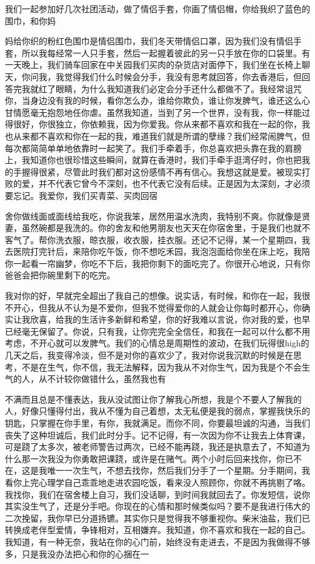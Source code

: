 \documentclass{article}
\begin{document}
我们一起参加好几次社团活动，做了情侣手套，你画了情侣帽，你给我织了蓝色的围巾，和你妈

\newpage 

妈给你织的粉红色围巾是情侣围巾，我们冬天带情侣口罩，因为我们没有情侣手套，所以我每经常一人只手套，然后一起握着彼此的另一只手放在你的口袋里。有一天晚上，我们骑车回家在中关园我们买肉的杂货店对面停下，我们坐在长椅上聊天，你问我，我觉得我们什么时候会分手，我没有思考就回答，你去香港后，但回答完我就红了眼睛，为什么我知道我们必定会分手还什么都做不了。我经常诅咒你，当身边没有我的时候，看你怎么办，谁给你欺负，谁让你发脾气，谁还这么心甘情愿毫无抱怨地任你虐。虽然我知道，当到了另一个世界，没有我，你一样能过得很好，你很独立，你依赖我，因为你爱我。你从来都不喜欢和我在一起的你，我也从来都不喜欢和你在一起的我，难道我们就是所谓的孽缘？我们经常闹脾气，但每次都简简单单地依靠时一起笑了。我们手牵着手，你总喜欢把头靠在我的肩膀上，我知道你也很珍惜这些瞬间，就算在香港时，我们手牵手逛湾仔时，你也把我的手握得很紧，尽管此时我们都对这份感情不再有信心。我想这就是爱。被现实打败的爱，并不代表它曾今不深刻，也不代表它没有后续。正是因为太深刻，才必须要忘记。我爱你，我们买青菜、买肉回宿

\newpage 

舍你做线面或面线给我吃，你说我笨，居然用温水洗肉，我特别不爽。你就像是贤妻，虽然碗都是我洗的。你的舍友和他男朋友也天天在你宿舍里，于是我们也就不客气了。帮你洗衣服，晾衣服，收衣服，挂衣服。还记不记得，某一个星期四，我去医院打完针后，来陪你吃午饭，你不想吃禾园，我泡泡面给你坐在床上吃，我陪你一起看一帘幽梦，你吃不下后，我把你剩下的面吃完了。你很开心地说，只有你爸爸会把你碗里剩下的吃完。

我对你的好，早就完全超出了我自己的想像。说实话，有时候，和你在一起，我很不开心，但我从不认为是不爱你，但我不觉得爱你的人就会让你每时都开心，你确实让我欣喜，给我的生活许多新鲜和希望，你的好我难以言说，你对我的爱，也早已经毫无保留了。你说，只有我，让你完完全全信任，和我在一起可以什么都不用考虑，不开心就可以发脾气。我们的心情总是周期性的波动，在我们玩得很high的几天之后，我变得冷淡，但不是对你的喜欢少了，我对你说我沉默的时候是在思考，不是在生气，你不信，我无法解释，因为我从不对你生气，因为我是个不会生气的人，从不计较你做错什么，虽然我也有

\newpage 

不满而且总是不懂表达，我从没试图让你了解我心所想，我是个不要人了解我的人，好像只懂得付出，我从不懂为自己着想，太无私便是我的弱点，掌握我快乐的钥匙，只掌握在你手里，有你，我就满足。而你不同，你要最坦诚的沟通，当我们丧失了这种坦诚后，我们此时分手。记不记得，有一次因为你不让我去上体育课，可是跷了太多次，被老师警告过两次，已经不能再跷，我还是执意去了，不知道为什么那一次我没为你勇敢把课跷，或许是在赌气。两个小时后回来找你，你已不在，这是我唯一一次生气，不想去找你，然后我们分手了一个星期。分手期间，我看你上完心理学自己乖乖地走进农园吃饭，看来没人照顾你，你就不再挑剔了咯。我找你，我们在宿舍楼上自习，我们没话聊，到时间我就回去了。你发短信，说你其实没生气了，还是分手吧。你现在的心情和那时候类似吗？要不是我进行伟大的二次挽留，我你早已分道扬镳。其实你只是觉得我不够重视你。柴米油盐，我们已转换成老伴型爱情，争锋相对，互相嫌弃。我知道，你不喜欢和我在一起的自己。我知道，有一种无奈，我站在你的心门前，始终没有走进去，不是因为我做得不够多，只是我没办法把心和你的心捆在一
\end{document}

